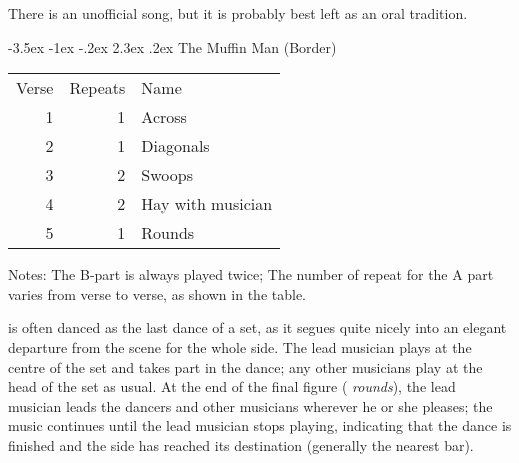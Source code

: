 \documentclass[12pt,a4paper]{article}
\makeatletter
\renewcommand\section{\@startsection {section}{1}{\z@}%
                                   {-3.5ex \@plus -1ex \@minus -.2ex}%
                                   {2.3ex \@plus.2ex}%
                                   {\normalfont\Large}}
\makeatother
\begin{document}
There is an unofficial song, but it is probably best left
as an oral tradition.

\section{The Muffin Man (Border)}


\begin{minipage}[t]{7cm}
\vspace{0pt}
\begin{tabular}{rrl}
Verse & Repeats & Name \\
1 & 1 & Across \\
2 & 1 & Diagonals \\
3 & 2 & Swoops \\
4 & 2 & Hay with musician \\
5 & 1 & Rounds \\
\end{tabular}
\end{minipage} \hspace{3mm} \begin{minipage}[t]{9cm}
\vspace{0pt}
\noindent Notes: The B-part is always played twice; The number of
repeat for the A part varies from verse to verse, as shown in the
table.
\end{minipage}

\medskip

 is often danced as the last dance of a
set, as it segues quite nicely into an elegant departure from the
scene for the whole side.  The lead musician plays at the centre of
the set and takes part in the dance; any other musicians play at the
head of the set as usual. At the end of the final figure ({\it
  rounds}), the lead musician leads the dancers and other musicians
wherever he or she pleases; the music continues until the lead
musician stops playing, indicating that the dance is finished and the
side has reached its destination (generally the nearest bar).

\newenvironment{dance}[3]
{\begin{minipage}[t][60mm]{53mm}
\smallskip\small
{\bf #1}\\
#2 dancers / #3
\vspace{-2mm}
\begin{tabbing}
}
{\end{tabbing}\end{minipage}}
\end{document}
